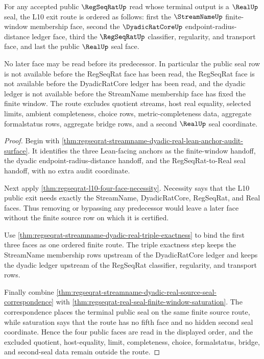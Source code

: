\begin{theorem}
\label{thm:regseqrat-l10-exit-route-order-lock}
For any accepted public $\RegSeqRatUp$ read whose terminal output is a
$\RealUp$ seal, the L10 exit route is ordered as follows: first the
$\StreamNameUp$ finite-window membership face, second the $\DyadicRatCoreUp$
endpoint-radius-distance ledger face, third the $\RegSeqRatUp$ classifier,
regularity, and transport face, and last the public $\RealUp$ seal face.

No later face may be read before its predecessor. In particular the public
seal row is not available before the RegSeqRat face has been read, the
RegSeqRat face is not available before the DyadicRatCore ledger has been read,
and the dyadic ledger is not available before the StreamName membership face
has fixed the finite window. The route excludes quotient streams, host real
equality, selected limits, ambient completeness, choice rows,
metric-completeness data, aggregate formalstatus rows, aggregate bridge rows,
and a second $\RealUp$ seal coordinate.
\end{theorem}
\begin{proof}
Begin with
\autoref{thm:regseqrat-streamname-dyadic-real-lean-anchor-audit-surface}. It
identifies the three Lean-facing anchors as the finite-window handoff, the
dyadic endpoint-radius-distance handoff, and the RegSeqRat-to-Real seal
handoff, with no extra audit coordinate.

Next apply \autoref{thm:regseqrat-l10-four-face-necessity}. Necessity says
that the L10 public exit needs exactly the StreamName, DyadicRatCore,
RegSeqRat, and Real faces. Thus removing or bypassing any predecessor would
leave a later face without the finite source row on which it is certified.

Use \autoref{thm:regseqrat-streamname-dyadic-real-triple-exactness} to bind
the first three faces as one ordered finite route. The triple exactness step
keeps the StreamName membership rows upstream of the DyadicRatCore ledger and
keeps the dyadic ledger upstream of the RegSeqRat classifier, regularity, and
transport rows.

Finally combine
\autoref{thm:regseqrat-streamname-dyadic-real-source-seal-correspondence} with
\autoref{thm:regseqrat-real-seal-finite-window-saturation}. The correspondence
places the terminal public seal on the same finite source route, while
saturation says that the route has no fifth face and no hidden second seal
coordinate. Hence the four public faces are read in the displayed order, and
the excluded quotient, host-equality, limit, completeness, choice,
formalstatus, bridge, and second-seal data remain outside the route.
\end{proof}

